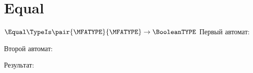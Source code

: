 \section{Equal}
\begin{frame}{$\Equal\TypeIs\pair{\MFATYPE}{\MFATYPE}\to\BooleanTYPE$}
	Первый автомат:


	Второй автомат:


	Результат:

\end{frame}